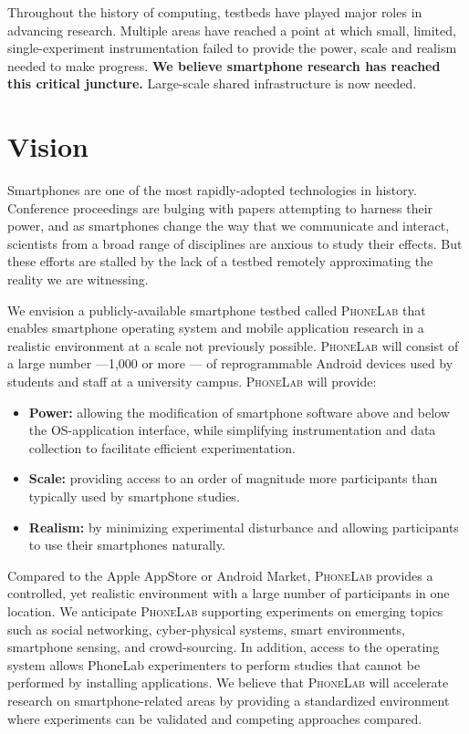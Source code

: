 Throughout the history of computing, testbeds have played major roles in
advancing research. Multiple areas have reached a point at which small,
limited, single-experiment instrumentation failed to provide the power, scale
and realism needed to make progress. \textbf{We believe smartphone research
has reached this critical juncture.} Large-scale shared infrastructure is now
needed.

\section{Vision}

Smartphones are one of the most rapidly-adopted technologies in history.
Conference proceedings are bulging with papers attempting to harness their
power, and as smartphones change the way that we communicate and interact,
scientists from a broad range of disciplines are anxious to study their
effects. But these efforts are stalled by the lack of a testbed remotely
approximating the reality we are witnessing.

We envision a publicly-available smartphone testbed called {\scshape
PhoneLab} that enables smartphone operating system and mobile application
research in a realistic environment at a scale not previously possible.
{\scshape PhoneLab} will consist of a large number ---1,000 or more --- of
reprogrammable Android devices used by students and staff at a university
campus. {\scshape PhoneLab} will provide:

\begin{itemize}

\item \textbf{Power:} allowing the modification of smartphone software above
and below the OS-application interface, while simplifying instrumentation and
data collection to facilitate efficient experimentation.

\item \textbf{Scale:} providing access to an order of magnitude more
participants than typically used by smartphone studies.

\item \textbf{Realism:} by minimizing experimental disturbance and allowing
participants to use their smartphones naturally.

\end{itemize}

Compared to the Apple AppStore or Android Market, {\scshape PhoneLab}
provides a controlled, yet realistic environment with a large number of
participants in one location. We anticipate {\scshape PhoneLab} supporting
experiments on emerging topics such as social networking, cyber-physical
systems, smart environments, smartphone sensing, and crowd-sourcing. In
addition, access to the operating system allows PhoneLab experimenters to
perform studies that cannot be performed by installing applications. We
believe that {\scshape PhoneLab} will accelerate research on
smartphone-related areas by providing a standardized environment where
experiments can be validated and competing approaches compared.

